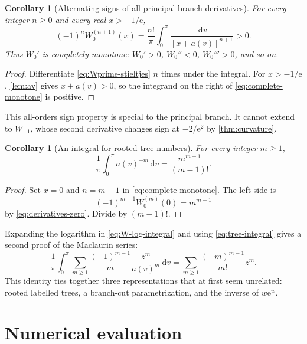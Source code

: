 \documentclass[11pt]{article}
\newtheorem{corollary}[theorem]{Corollary}
\theoremstyle{remark}
\newcommand{\ee}{\mathrm e}
\newcommand{\dd}{\,\mathrm d}
\begin{document}
\begin{corollary}[Alternating signs of all principal-branch derivatives]
For every integer \(n\geq0\) and every real \(x>-1/\ee\),
\begin{equation}\label{eq:complete-monotone}
 (-1)^n W_0^{(n+1)}(x)
 =\frac{n!}{\pi}\int_0^\pi
 \frac{\dd v}{[x+a(v)]^{n+1}}>0.
\end{equation}
Thus \(W_0'\) is completely monotone: \(W_0'>0\),
\(W_0''<0\), \(W_0'''>0\), and so on.
\end{corollary}

\begin{proof}
Differentiate \eqref{eq:Wprime-stieltjes} \(n\) times under the integral.
For \(x>-1/\ee\), \cref{lem:av} gives \(x+a(v)>0\), so the integrand on
the right of \eqref{eq:complete-monotone} is positive.
\end{proof}

This all-orders sign property is special to the principal branch.  It cannot
extend to \(W_{-1}\), whose second derivative changes sign at
\(-2/\ee^2\) by \cref{thm:curvature}.

\begin{corollary}[An integral for rooted-tree numbers]\label{cor:tree-integral}
For every integer \(m\geq1\),
\begin{equation}\label{eq:tree-integral}
 \frac1\pi\int_0^\pi a(v)^{-m}\dd v
 =\frac{m^{m-1}}{(m-1)!}.
\end{equation}
\end{corollary}

\begin{proof}
Set \(x=0\) and \(n=m-1\) in
\eqref{eq:complete-monotone}.  The left side is
\[
       (-1)^{m-1}W_0^{(m)}(0)
       =m^{m-1}
\]
by \eqref{eq:derivatives-zero}.  Divide by \((m-1)!\).
\end{proof}

Expanding the logarithm in \eqref{eq:W-log-integral} and using
\eqref{eq:tree-integral} gives a second proof of the Maclaurin series:
\[
 \frac1\pi\int_0^\pi\sum_{m\geq1}
 \frac{(-1)^{m-1}}m\frac{z^m}{a(v)^m}\dd v
 =
 \sum_{m\geq1}\frac{(-m)^{m-1}}{m!}z^m.
\]
This identity ties together three representations that at first seem
unrelated: rooted labelled trees, a branch-cut parametrization, and the
inverse of \(w\ee^w\).


\section{Numerical evaluation}\label{sec:numerics}
\end{document}
